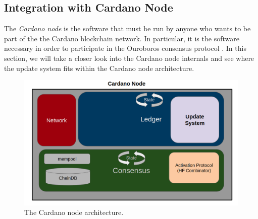 \subsection{Integration with Cardano Node} \label{integration_with_cardano}
The \emph{Cardano node} is the software that must be run by anyone who wants to 
be part of the the Cardano blockchain network. In particular, it is the 
software necessary in order to participate in the 
Ouroboros consensus protocol \cite{C:KRDO17}. In this section, we will take a 
closer look into the Cardano node internals and see where the update 
system fits within the Cardano node architecture. 

\begin{figure}[h!] %
	\centering
	\includegraphics[width=0.8\columnwidth,
	keepaspectratio]{figures/cardano_node.png}
	\caption{The Cardano node architecture.}
	\label{fig:cardano_node}
\end{figure}


